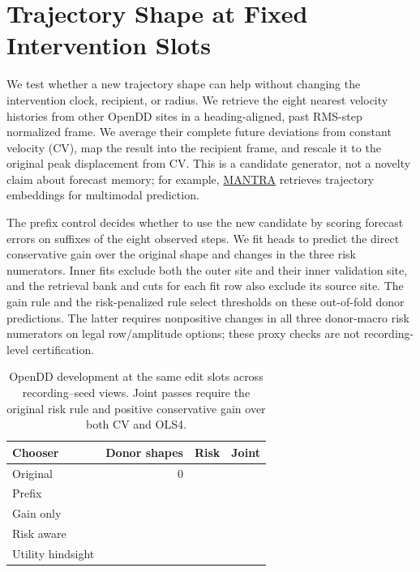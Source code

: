 \section{Trajectory Shape at Fixed Intervention Slots}

We test whether a new trajectory shape can help without changing the
intervention clock, recipient, or radius. We retrieve the eight nearest
velocity histories from other OpenDD sites in a heading-aligned, past
RMS-step normalized frame. We average their complete future deviations
from constant velocity (CV), map the result into the recipient frame,
and rescale it to the original peak displacement from CV. This is a
candidate generator, not a novelty claim about forecast memory; for
example, \href{https://openaccess.thecvf.com/content_CVPR_2020/html/Marchetti_MANTRA_Memory_Augmented_Networks_for_Multiple_Trajectory_Prediction_CVPR_2020_paper.html}{MANTRA}
retrieves trajectory embeddings for multimodal prediction.

The prefix control decides whether to use the new candidate by scoring
forecast errors on suffixes of the eight observed steps. We fit
\ShapeFits{} heads to predict the direct conservative gain over the
original shape and changes in the three risk numerators. Inner fits
exclude both the outer site and their inner validation site, and the
retrieval bank and cuts for each fit row also exclude its source site.
The gain rule and the risk-penalized rule select thresholds on these
out-of-fold donor predictions. The latter requires nonpositive changes in
all three donor-macro risk numerators on legal row/amplitude options;
these proxy checks are not recording-level certification.

\begin{table}[h]
\centering
\caption{OpenDD development at the same \ShapeEdits{} edit slots across
\ShapeViews{} recording--seed views. Joint passes require the original
risk rule and positive conservative gain over both CV and OLS4.}
\small
\begin{tabular}{lrrr}
\toprule
Chooser & Donor shapes & Risk & Joint \\
\midrule
Original & 0 & \ShapeAnchorSafety{} & \ShapeAnchorPass{} \\
Prefix & \ShapePrefixChoices{} & \ShapePrefixSafety{} & \ShapePrefixPass{} \\
Gain only & \ShapeGainChoices{} & \ShapeGainSafety{} & \ShapeGainPass{} \\
Risk aware & \ShapeRiskChoices{} & \ShapeRiskSafety{} & \ShapeRiskPass{} \\
Utility hindsight & \ShapeOracleChoices{} & \ShapeOracleSafety{} & \ShapeOraclePass{} \\
\bottomrule
\end{tabular}
\end{table}

